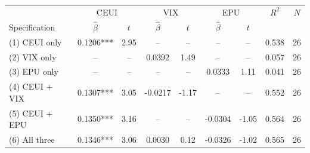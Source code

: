 \begin{tabular}{lcccccccc}
\toprule
 & \multicolumn{2}{c}{CEUI} & \multicolumn{2}{c}{VIX} & \multicolumn{2}{c}{EPU} & $R^2$ & $N$ \\
Specification & $\hat{\beta}$ & $t$ & $\hat{\beta}$ & $t$ & $\hat{\beta}$ & $t$ & & \\
\midrule
(1) CEUI only & 0.1206*** & 2.95 & -- & -- & -- & -- & 0.538 & 26 \\
(2) VIX only & -- & -- & 0.0392 & 1.49 & -- & -- & 0.057 & 26 \\
(3) EPU only & -- & -- & -- & -- & 0.0333 & 1.11 & 0.041 & 26 \\
(4) CEUI + VIX & 0.1307*** & 3.05 & -0.0217 & -1.17 & -- & -- & 0.552 & 26 \\
(5) CEUI + EPU & 0.1350*** & 3.16 & -- & -- & -0.0304 & -1.05 & 0.564 & 26 \\
(6) All three & 0.1346*** & 3.06 & 0.0030 & 0.12 & -0.0326 & -1.02 & 0.565 & 26 \\
\bottomrule
\end{tabular}

